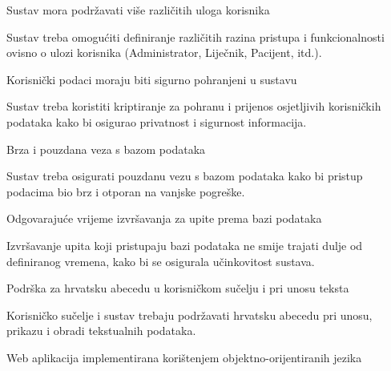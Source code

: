 			 \begin{packed_enum}
				
				\large \item Sustav mora podržavati više različitih uloga korisnika \normalsize
                    \begin{packed_item}
                        \item Sustav treba omogućiti definiranje različitih razina pristupa i funkcionalnosti ovisno o ulozi korisnika (Administrator, Liječnik, Pacijent, itd.).
                    \end{packed_item}
				 \large \item Korisnički podaci moraju biti sigurno pohranjeni u sustavu	\normalsize
                    \begin{packed_item}
                        \item Sustav treba koristiti kriptiranje za pohranu i prijenos osjetljivih korisničkih podataka kako bi osigurao privatnost i sigurnost informacija.
                    \end{packed_item}
				 \large \item Brza i pouzdana veza s bazom podataka \normalsize
                    \begin{packed_item}
                        \item Sustav treba osigurati pouzdanu vezu s bazom podataka kako bi pristup podacima bio brz i otporan na vanjske pogreške.
                    \end{packed_item}
                 \large \item Odgovarajuće vrijeme izvršavanja za upite prema bazi podataka \normalsize
                    \begin{packed_item}
                        \item Izvršavanje upita koji pristupaju bazi podataka ne smije trajati dulje od definiranog vremena, kako bi se osigurala učinkovitost sustava.
                    \end{packed_item}
                 \large \item Podrška za hrvatsku abecedu u korisničkom sučelju i pri unosu teksta \normalsize
                    \begin{packed_item}
                        \item Korisničko sučelje i sustav trebaju podržavati hrvatsku abecedu pri unosu, prikazu i obradi tekstualnih podataka.
                    \end{packed_item}
                 \large \item Web aplikacija implementirana korištenjem objektno-orijentiranih jezika \normalsize

\end{packed_enum}
